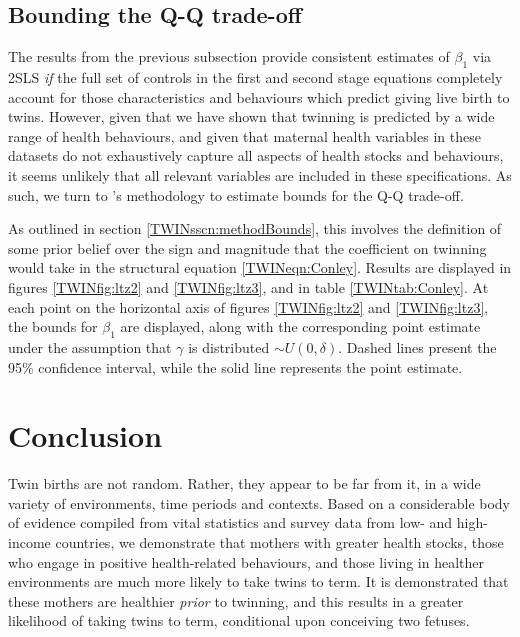 \documentclass[subeqn]{article}
\begin{document}
\begin{spacing}{1.4}


\subsection{Bounding the Q-Q trade-off}            \label{TWINsscn:resultBounds}
The results from the previous subsection provide consistent estimates of 
$\beta_1$ via 2SLS \emph{if} the full set of controls in the first and second 
stage equations completely account for 
those characteristics and behaviours which predict giving live birth to twins. 
However, given that we have shown that twinning is predicted by a wide range of 
health behaviours, and given that maternal health variables in these datasets 
do not exhaustively capture all aspects of health stocks and behaviours, it 
seems unlikely that all relevant variables are included in these specifications. 
As such, we turn to \citeauthor{Conleyetal2012}'s \citeyear{Conleyetal2012} 
methodology to estimate bounds for the Q-Q trade-off.  

As outlined in section \ref{TWINsscn:methodBounds}, this involves the definition 
of some prior belief over the sign and magnitude that the coefficient on 
twinning would take in the structural equation \ref{TWINeqn:Conley}. Results 
are displayed in figures \ref{TWINfig:ltz2} and \ref{TWINfig:ltz3}, and in 
table \ref{TWINtab:Conley}. At each point on the horizontal axis of figures 
\ref{TWINfig:ltz2} and \ref{TWINfig:ltz3}, the bounds for $\beta_1$ are 
displayed, along with the corresponding point estimate under the assumption 
that $\gamma$ is distributed $\sim U(0,\delta)$. Dashed lines present the 95\% 
confidence interval, while the solid line represents the point estimate.


\section{Conclusion}                               \label{TWINscn:conclusion}
Twin births are not random.  Rather, they appear to be far from it, in a wide
variety of environments, time periods and contexts.  Based on a considerable 
body of evidence compiled from vital statistics and survey data from low- and 
high-income countries, we demonstrate that mothers with greater health stocks,
those who engage in positive health-related behaviours, and those living in 
healther environments are much more likely to take twins to term.  It is 
demonstrated that these mothers are healthier \emph{prior} to twinning, and
this results in a greater likelihood of taking twins to term, conditional upon
conceiving two fetuses.


\end{spacing}
\end{document}
